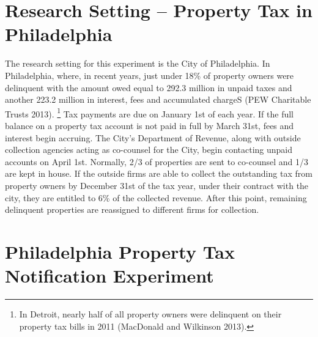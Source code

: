 \documentclass[12pt,titlepage]{article}
\begin{document}
\section{Research Setting -- Property Tax in Philadelphia}

The research setting for this experiment is the City of
Philadelphia. In Philadelphia, where, in recent years, just under
18\% of property owners were delinquent with the amount owed equal
to 292.3 million in unpaid taxes and another 223.2 million in interest,
fees and accumulated chargeS (PEW Charitable Trusts 2013).
\footnote{
	In Detroit, nearly half of all property owners were delinquent
    on their property tax bills in 2011 (MacDonald and Wilkinson 2013).
}
Tax payments are due on January 1st of each year. If the full balance on a
property tax account is not paid in full by March 31st, fees and interest
begin accruing. The City’s Department of Revenue, along with outside
collection agencies acting as co-counsel for the City, begin contacting
unpaid accounts on April 1st. Normally, 2/3 of properties are sent to
co-counsel and 1/3 are kept in house. If the outside firms are able to
collect the outstanding tax from property owners by December 31st of the
tax year, under their contract with the city, they are entitled to 6\% of
the collected revenue. After this point, remaining delinquent properties
are reassigned to different firms for collection.

\section{Philadelphia Property Tax Notification Experiment}
\end{document}
